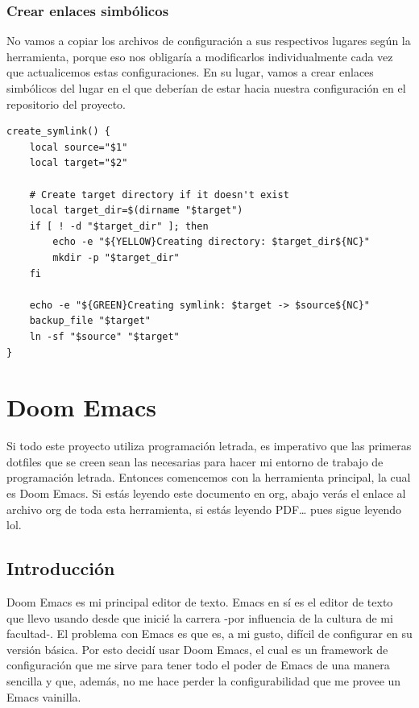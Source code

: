 \documentclass[11pt]{article}
\begin{document}
\subsubsection{Crear enlaces simbólicos}
\label{sec:org0a0359e}

No vamos a copiar los archivos de configuración a sus respectivos lugares según la herramienta, porque eso nos obligaría a modificarlos individualmente cada vez que actualicemos estas configuraciones. En su lugar, vamos a crear enlaces simbólicos del lugar en el que deberían de estar hacia nuestra configuración en el repositorio del proyecto.

\begin{verbatim}
create_symlink() {
    local source="$1"
    local target="$2"

    # Create target directory if it doesn't exist
    local target_dir=$(dirname "$target")
    if [ ! -d "$target_dir" ]; then
        echo -e "${YELLOW}Creating directory: $target_dir${NC}"
        mkdir -p "$target_dir"
    fi

    echo -e "${GREEN}Creating symlink: $target -> $source${NC}"
    backup_file "$target"
    ln -sf "$source" "$target"
}
\end{verbatim}
\section{Doom Emacs}
\label{sec:org858e5c0}

Si todo este proyecto utiliza programación letrada, es imperativo que las primeras dotfiles que se creen sean las necesarias para hacer mi entorno de trabajo de programación letrada. Entonces comencemos con la herramienta principal, la cual es Doom Emacs. Si estás leyendo este documento en org, abajo verás el enlace al archivo org de toda esta herramienta, si estás leyendo PDF\ldots{} pues sigue leyendo lol.
\subsection{Introducción}
\label{sec:org5386646}
Doom Emacs es mi principal editor de texto. Emacs en sí es el editor de texto que llevo usando desde que inicié la carrera -por influencia de la cultura de mi facultad-. El problema con Emacs es que es, a mi gusto, difícil de configurar en su versión básica. Por esto decidí usar Doom Emacs, el cual es un framework de configuración que me sirve para tener todo el poder de Emacs de una manera sencilla y que, además, no me hace perder la configurabilidad que me provee un Emacs vainilla.
\end{document}
